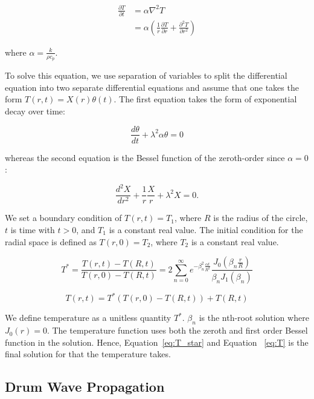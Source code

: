 \documentclass[linenumbers, twocolumn]{aastex631}
\begin{document}
\begin{align}
    \frac{\partial T}{\partial t}&=\alpha\nabla^2T\\
    &=\alpha\left(\frac{1}{r} \frac{\partial T}{\partial r} + \frac{\partial^2 T}{\partial r^2}\right)
\end{align}

\noindent where $\alpha=\frac{k}{\rho c_p}$.

To solve this equation, we use separation of variables to split the 
differential equation into two separate differential equations and assume
that one takes the form $T(r,t)=X(r)\theta(t)$. The first equation takes the
form of exponential decay over time:

\begin{equation}
    \frac{d\theta}{dt}+\lambda^2\alpha\theta=0
\end{equation}

\noindent whereas the second equation is the Bessel function of the zeroth-order
since $\alpha=0$:

\begin{equation}
    \frac{d^2X}{dr^2}+\frac{1}{r}\frac{X}{r}+\lambda^2X=0.
\end{equation}

We set a boundary condition of $T(r,t)=T_1$, where $R$ is the radius of the circle,
$t$ is time with $t>0$, and $T_1$ is a constant real value. The initial condition for
the radial space is defined as $T(r,0)=T_2$, where $T_2$ is a constant real value.

\begin{equation}
    T^*=\frac{T(r,t)-T(R,t)}{T(r,0)-T(R,t)}=2\sum_{n=0}^\infty e^{-\beta_{n}^2 \frac{\alpha t}{R^2}} \frac{J_0(\beta_n\frac{r}{R})}{\beta_nJ_1(\beta_n)}
    \label{eq:T_star}
\end{equation}

\begin{equation}
    T(r,t)=T^*(T(r,0)-T(R,t))+T(R,t)
    \label{eq:T}
\end{equation}

\noindent We define temperature as a unitless quantity $T^*$. $\beta_n$ is the
nth-root solution where $J_0(r)=0$. The temperature function uses both the zeroth
and first order Bessel function in the solution. Hence, Equation~\ref{eq:T_star}
and Equation ~\ref{eq:T} is the final solution for that the temperature takes.\\


\subsection{Drum Wave Propagation}
\end{document}
